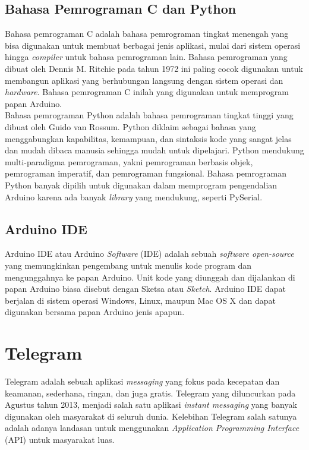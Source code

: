 \subsection{Bahasa Pemrograman C dan Python}
\tab Bahasa pemrograman C adalah bahasa pemrograman tingkat menengah yang bisa digunakan untuk membuat berbagai jenis aplikasi, mulai dari sistem operasi hingga \textit{compiler} untuk bahasa pemrograman lain. Bahasa pemrograman yang dibuat oleh Dennis M. Ritchie pada tahun 1972 ini paling cocok digunakan untuk membangun aplikasi yang berhubungan langsung dengan sistem operasi dan \textit{hardware}. Bahasa pemrograman C inilah yang digunakan untuk memprogram papan Arduino.\\
\tab Bahasa pemrograman Python adalah bahasa pemrograman tingkat tinggi yang dibuat oleh Guido van Rossum. Python diklaim sebagai bahasa yang menggabungkan kapabilitas, kemampuan, dan sintaksis kode yang sangat jelas dan mudah dibaca manusia sehingga mudah untuk dipelajari. Python mendukung multi-paradigma pemrograman, yakni pemrograman berbasis objek, pemrograman imperatif, dan pemrograman fungsional. Bahasa pemrograman Python banyak dipilih untuk digunakan dalam memprogram pengendalian Arduino karena ada banyak \textit{library} yang mendukung, seperti PySerial.

\subsection{Arduino IDE}
\tab Arduino IDE atau Arduino \textit{Software} (IDE) adalah sebuah \textit{software open-source} yang memungkinkan pengembang untuk menulis kode program dan mengunggahnya ke papan Arduino. Unit kode yang diunggah dan dijalankan di papan Arduino biasa disebut dengan Sketsa atau \textit{Sketch}. Arduino IDE dapat berjalan di sistem operasi Windows, Linux, maupun Mac OS X dan dapat digunakan bersama papan Arduino jenis apapun. 

\section{Telegram}
\tab Telegram adalah sebuah aplikasi \textit{messaging} yang fokus pada kecepatan dan keamanan, sederhana, ringan, dan juga gratis. Telegram yang diluncurkan pada Agustus tahun 2013, menjadi salah satu aplikasi \textit{instant messaging} yang banyak digunakan oleh masyarakat di seluruh dunia. Kelebihan Telegram salah satunya adalah adanya landasan untuk menggunakan \textit{Application Programming Interface} (API) untuk
masyarakat luas.

